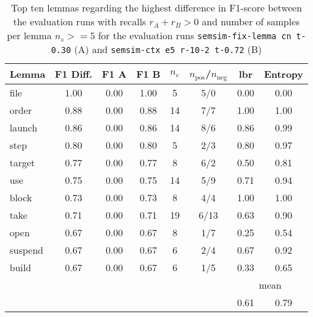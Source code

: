 \documentclass[11pt]{scrreprt}
\begin{document}
{\begin{table}[p]
\centering
\begin{tabular}{lccccccc}
\toprule
Lemma      & F1 Diff. & F1 A & F1 B & \(n_e\) & \(n_\text{pos}\)/\(n_\text{neg}\) & \gls{lbr} & Entropy \\
\midrule
file       & 1.00      & 0.00           & 1.00           & 5               & 5/0     & 0.00 & 0.00 \\
order      & 0.88      & 0.00           & 0.88           & 14              & 7/7     & 1.00 & 1.00 \\
launch     & 0.86      & 0.00           & 0.86           & 14              & 8/6     & 0.86 & 0.99 \\
step       & 0.80      & 0.00           & 0.80           & 5               & 2/3     & 0.80 & 0.97 \\
target     & 0.77      & 0.00           & 0.77           & 8               & 6/2     & 0.50 & 0.81 \\
use        & 0.75      & 0.00           & 0.75           & 14              & 5/9     & 0.71 & 0.94 \\
block      & 0.73      & 0.00           & 0.73           & 8               & 4/4     & 1.00 & 1.00 \\
take       & 0.71      & 0.00           & 0.71           & 19              & 6/13    & 0.63 & 0.90 \\
open       & 0.67      & 0.00           & 0.67           & 8               & 1/7     & 0.25 & 0.54 \\
suspend    & 0.67      & 0.00           & 0.67           & 6               & 2/4     & 0.67 & 0.92 \\
build      & 0.67      & 0.00           & 0.67           & 6               & 1/5     & 0.33 & 0.65 \\
\cmidrule{7-8}
\multicolumn{6}{l}{} & \multicolumn{2}{c}{mean} \\
\multicolumn{6}{l}{} & 0.61 & 0.79 \\
\bottomrule
\end{tabular}
\caption{Top ten lemmas regarding the highest difference in F1-score between the evaluation runs with recalls \(r_A + r_B > 0\) and number of samples per lemma \(n_s >= 5\) for the evaluation runs \texttt{semsim-fix-lemma cn t-0.30} (A) and \texttt{semsim-ctx e5 r-10-2 t-0.72} (B)}
\label{tab:predicate-lemma-highest-f1}
\end{table}

}
\end{document}
